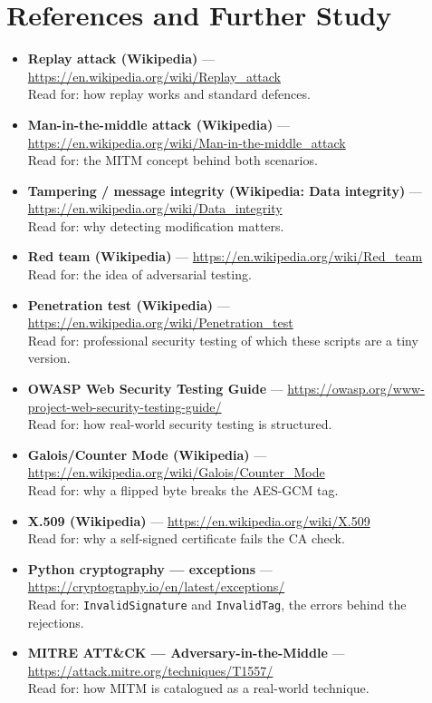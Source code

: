 \documentclass[11pt,a4paper]{report}
\begin{document}
\section{References and Further Study}
\begin{itemize}
  \item \textbf{Replay attack (Wikipedia)} ---
        \url{https://en.wikipedia.org/wiki/Replay_attack}\\
        Read for: how replay works and standard defences.
  \item \textbf{Man-in-the-middle attack (Wikipedia)} ---
        \url{https://en.wikipedia.org/wiki/Man-in-the-middle_attack}\\
        Read for: the MITM concept behind both scenarios.
  \item \textbf{Tampering / message integrity (Wikipedia: Data integrity)} ---
        \url{https://en.wikipedia.org/wiki/Data_integrity}\\
        Read for: why detecting modification matters.
  \item \textbf{Red team (Wikipedia)} ---
        \url{https://en.wikipedia.org/wiki/Red_team}\\
        Read for: the idea of adversarial testing.
  \item \textbf{Penetration test (Wikipedia)} ---
        \url{https://en.wikipedia.org/wiki/Penetration_test}\\
        Read for: professional security testing of which these scripts are a tiny version.
  \item \textbf{OWASP Web Security Testing Guide} ---
        \url{https://owasp.org/www-project-web-security-testing-guide/}\\
        Read for: how real-world security testing is structured.
  \item \textbf{Galois/Counter Mode (Wikipedia)} ---
        \url{https://en.wikipedia.org/wiki/Galois/Counter_Mode}\\
        Read for: why a flipped byte breaks the AES-GCM tag.
  \item \textbf{X.509 (Wikipedia)} ---
        \url{https://en.wikipedia.org/wiki/X.509}\\
        Read for: why a self-signed certificate fails the CA check.
  \item \textbf{Python cryptography --- exceptions} ---
        \url{https://cryptography.io/en/latest/exceptions/}\\
        Read for: \texttt{InvalidSignature} and \texttt{InvalidTag}, the errors
        behind the rejections.
  \item \textbf{MITRE ATT\&CK --- Adversary-in-the-Middle} ---
        \url{https://attack.mitre.org/techniques/T1557/}\\
        Read for: how MITM is catalogued as a real-world technique.
\end{itemize}
\end{document}
